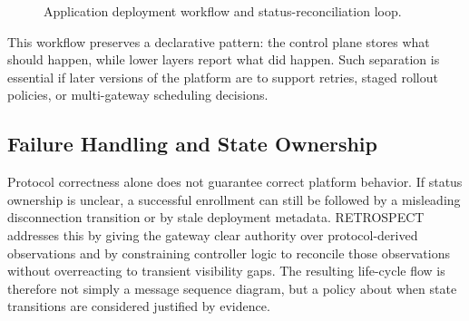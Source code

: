 \begin{figure}[t]
\centering
{}
\caption{Application deployment workflow and status-reconciliation loop.}
\label{fig:deployment-workflow}
\end{figure}

This workflow preserves a declarative pattern: the control plane stores what should happen, while lower layers report what did happen. Such separation is essential if later versions of the platform are to support retries, staged rollout policies, or multi-gateway scheduling decisions.

\subsection{Failure Handling and State Ownership}
Protocol correctness alone does not guarantee correct platform behavior. If status ownership is unclear, a successful enrollment can still be followed by a misleading disconnection transition or by stale deployment metadata. RETROSPECT addresses this by giving the gateway clear authority over protocol-derived observations and by constraining controller logic to reconcile those observations without overreacting to transient visibility gaps. The resulting life-cycle flow is therefore not simply a message sequence diagram, but a policy about when state transitions are considered justified by evidence.
